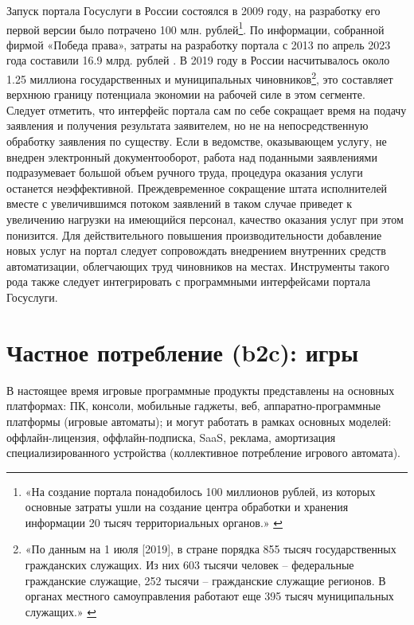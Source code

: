 \documentclass{article}
\begin{document}
Запуск портала Госуслуги в России состоялся в 2009 году, на разработку его первой версии было потрачено 100 млн. рублей\footnote{«На создание портала понадобилось 100 миллионов рублей, из которых основные затраты ушли на создание центра обработки и хранения информации 20 тысяч территориальных органов.» \cite{gosuslugiLaunch2009}}. По информации, собранной фирмой «Победа права», затраты на разработку портала с 2013 по апрель 2023 года составили 16.9 млрд. рублей \cite{gosuslugiDevCostEstimate2023}. В 2019 году в России насчитывалось около 1.25 миллиона государственных и муниципальных чиновников\footnote{«По данным на 1 июля [2019], в стране порядка 855 тысяч государственных гражданских служащих. Из них 603 тысячи человек – федеральные гражданские служащие, 252 тысячи – гражданские служащие регионов. В органах местного самоуправления работают еще 395 тысяч муниципальных служащих.» \cite{minfinNumberOfOfficials2019}}, это составляет верхнюю границу потенциала экономии на рабочей силе в этом сегменте. Следует отметить, что интерфейс портала сам по себе сокращает время на подачу заявления и получения результата заявителем, но не на непосредственную обработку заявления по существу. Если в ведомстве, оказывающем услугу, не внедрен электронный документооборот, работа над поданными заявлениями подразумевает большой объем ручного труда, процедура оказания услуги останется неэффективной. Преждевременное сокращение штата исполнителей вместе с увеличившимся потоком заявлений в таком случае приведет к увеличению нагрузки на имеющийся персонал, качество оказания услуг при этом понизится. Для действительного повышения производительности добавление новых услуг на портал следует сопровождать внедрением внутренних средств автоматизации, облегчающих труд чиновников на местах. Инструменты такого рода также следует интегрировать с программными интерфейсами портала Госуслуги.

\section*{Частное потребление (b2c): игры}

В настоящее время игровые программные продукты представлены на основных платформах: ПК, консоли, мобильные гаджеты, веб, аппаратно-программные платформы (игровые автоматы); и могут работать в рамках основных моделей: оффлайн-лицензия, оффлайн-подписка, SaaS, реклама, амортизация специализированного устройства (коллективное потребление игрового автомата).
\end{document}
